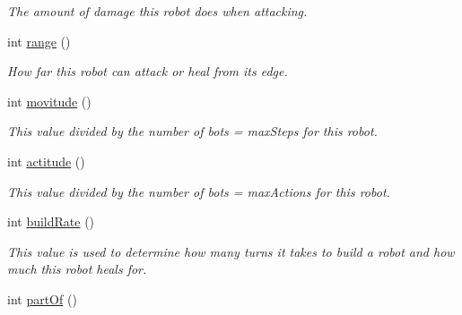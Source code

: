 \begin{DoxyCompactItemize}
\begin{DoxyCompactList}\small\item\em The amount of damage this robot does when attacking. \item\end{DoxyCompactList}\item 
\hypertarget{classBot_a8fd584436d258d25f09cc535f53a6775}{
int \hyperlink{classBot_a8fd584436d258d25f09cc535f53a6775}{range} ()}
\label{classBot_a8fd584436d258d25f09cc535f53a6775}

\begin{DoxyCompactList}\small\item\em How far this robot can attack or heal from its edge. \item\end{DoxyCompactList}\item 
\hypertarget{classBot_a49a96305ac775de2b31ceef370ae135a}{
int \hyperlink{classBot_a49a96305ac775de2b31ceef370ae135a}{movitude} ()}
\label{classBot_a49a96305ac775de2b31ceef370ae135a}

\begin{DoxyCompactList}\small\item\em This value divided by the number of bots = maxSteps for this robot. \item\end{DoxyCompactList}\item 
\hypertarget{classBot_a87733c9b7400d2df33f07d38dad54a41}{
int \hyperlink{classBot_a87733c9b7400d2df33f07d38dad54a41}{actitude} ()}
\label{classBot_a87733c9b7400d2df33f07d38dad54a41}

\begin{DoxyCompactList}\small\item\em This value divided by the number of bots = maxActions for this robot. \item\end{DoxyCompactList}\item 
\hypertarget{classBot_aa30cc3cea31e7322bcc38c2cba1472d6}{
int \hyperlink{classBot_aa30cc3cea31e7322bcc38c2cba1472d6}{buildRate} ()}
\label{classBot_aa30cc3cea31e7322bcc38c2cba1472d6}

\begin{DoxyCompactList}\small\item\em This value is used to determine how many turns it takes to build a robot and how much this robot heals for. \item\end{DoxyCompactList}\item 
\hypertarget{classBot_a7cd6d04cbcfb705202350cfc7310c9af}{
int \hyperlink{classBot_a7cd6d04cbcfb705202350cfc7310c9af}{partOf} ()}
\label{classBot_a7cd6d04cbcfb705202350cfc7310c9af}


\end{DoxyCompactItemize}
